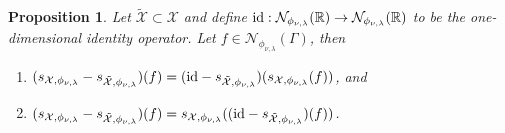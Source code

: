 \documentclass[pdflatex,sn-mathphys-num]{sn-jnl}%
\theoremstyle{thmstyleone}%
\newtheorem{proposition}{Proposition}%
\theoremstyle{thmstyletwo}%
\theoremstyle{thmstylethree}%
\begin{document}
\begin{proposition}\label{prop: rewrite differences}Let \(\tilde{\mathcal{X}}\subset\mathcal{X}\) and define \(\textup{id}:\mathcal{N}_{\phi_{\nu,\lambda}}(\mathbb{R})\rightarrow\mathcal{N}_{\phi_{\nu,\lambda}}(\mathbb{R})\) to be the one-dimensional identity operator. Let \(f\in\mathcal{N}_{\phi_{\nu,\lambda}}(\Gamma)\), then
\begin{enumerate}
    \item \((s_{\mathcal{X},\phi_{\nu,\lambda}}-s_{\tilde{\mathcal{X}},\phi_{\nu,\lambda}})(f)=(\textup{id}-s_{\tilde{\mathcal{X}},\phi_{\nu,\lambda}})(s_{\mathcal{X},\phi_{\nu,\lambda}}(f))\), and
    \item \(
        (s_{\mathcal{X},\phi_{\nu,\lambda}}-s_{\tilde{\mathcal{X}},\phi_{\nu,\lambda}})(f)=s_{\mathcal{X},\phi_{\nu,\lambda}}((\textup{id}-s_{\tilde{\mathcal{X}},\phi_{\nu,\lambda}})(f))
    \).
\end{enumerate}
\end{proposition}
\end{document}
